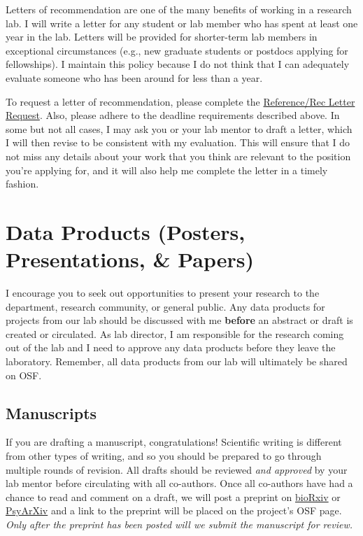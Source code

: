 \documentclass[
]{book}
\begin{document}
Letters of recommendation are one of the many benefits of working in a research lab. I will write a letter for any student or lab member who has spent at least one year in the lab. Letters will be provided for shorter-term lab members in exceptional circumstances (e.g., new graduate students or postdocs applying for fellowships). I maintain this policy because I do not think that I can adequately evaluate someone who has been around for less than a year.

To request a letter of recommendation, please complete the \href{https://docs.google.com/forms/d/1F_NeLFXH7F3mjJD0l_cS1RFaUSOPS_IdfeT4KvJvLgU/edit}{Reference/Rec Letter Request}. Also, please adhere to the deadline requirements described above. In some but not all cases, I may ask you or your lab mentor to draft a letter, which I will then revise to be consistent with my evaluation. This will ensure that I do not miss any details about your work that you think are relevant to the position you're applying for, and it will also help me complete the letter in a timely fashion.

\hypertarget{data-products-posters-presentations-papers}{%
\section{Data Products (Posters, Presentations, \& Papers)}\label{data-products-posters-presentations-papers}}

I encourage you to seek out opportunities to present your research to the department, research community, or general public. Any data products for projects from our lab should be discussed with me \textbf{before} an abstract or draft is created or circulated. As lab director, I am responsible for the research coming out of the lab and I need to approve any data products before they leave the laboratory. Remember, all data products from our lab will ultimately be shared on OSF.

\hypertarget{manuscripts}{%
\subsection{Manuscripts}\label{manuscripts}}

If you are drafting a manuscript, congratulations! Scientific writing is different from other types of writing, and so you should be prepared to go through multiple rounds of revision. All drafts should be reviewed \emph{and approved} by your lab mentor before circulating with all co-authors. Once all co-authors have had a chance to read and comment on a draft, we will post a preprint on \href{https://www.biorxiv.org/}{bioRxiv} or \href{https://psyarxiv.com/}{PsyArXiv} and a link to the preprint will be placed on the project's OSF page. \emph{Only after the preprint has been posted will we submit the manuscript for review.}
\end{document}
